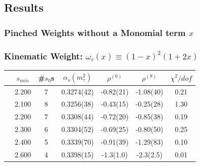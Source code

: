 \documentclass[fleqn]{beamer}
\begin{document}
\subsection{Results}
\subsubsection{Pinched Weights without a Monomial term \(x\)}
\begin{frame}
  \frametitle{Kinematic Weight: \(\omega_\tau(x) \equiv (1-x)^2(1+2x)\)}
  \begin{tabular}{ccccccc}
    \toprule
    & \(s_{min}\) & \#\(s_0\)s & \(\alpha_s(m_\tau^2)\) & \(\rho^{(6)}\) & \(\rho^{(8)}\) & \(\chi^2/dof\)  \\
    \midrule
    \parbox[t]{2mm}{}
    & 2.200 & 7 & 0.3274(42) & -0.82(21) & -1.08(40) & 0.21 \\
    \midrule
    \parbox[t]{2mm}{}
    & 2.100 & 8 & 0.3256(38) & -0.43(15) & -0.25(28) & 1.30 \\
    & 2.200 & 7 & 0.3308(44) & -0.72(20) & -0.85(38) & 0.19 \\
    & 2.300 & 6 & 0.3304(52) & -0.69(25) & -0.80(50) & 0.25 \\
    & 2.400 & 5 & 0.3339(70) & -0.91(39) & -1.29(83) & 0.10 \\
    & 2.600 & 4 & 0.3398(15) & -1.3(1.0) & -2.3(2.5) & 0.01  \\
    \bottomrule
  \end{tabular}
\end{frame}
\end{document}
